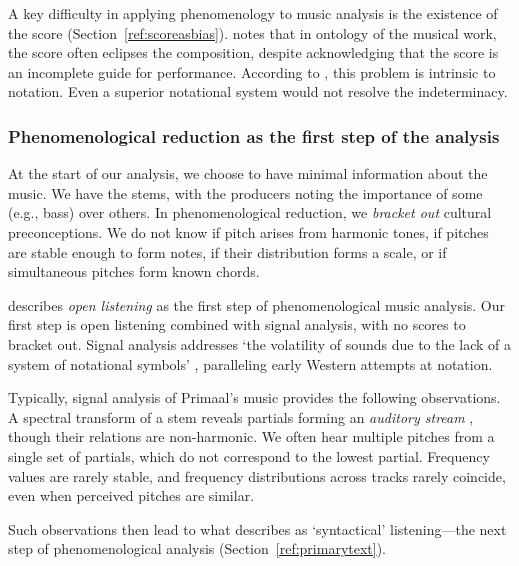 \documentclass{article}
\begin{document}

A key difficulty in applying phenomenology to music analysis is the existence of the score (Section~\ref{ref:scoreasbias}). \citet{benson2011phenomenology} notes that in  ontology of the musical work, the score often eclipses the composition, despite acknowledging that the score is an incomplete guide for performance. According to \citeauthor{benson2011phenomenology}, this problem is intrinsic to notation. Even a superior notational system would not resolve the indeterminacy.


\subsubsection{Phenomenological reduction as the first step of the analysis}\label{ref:reduction}



At the start of our analysis, we choose to have minimal information about the music. We have the stems, with the producers noting the importance of some (e.g., bass) over others. In phenomenological reduction, we \emph{bracket out} cultural preconceptions. We do not know if pitch arises from harmonic tones, if pitches are stable enough to form notes, if their distribution forms a scale, or if simultaneous pitches form known chords.%

\citet[p.~359]{ferrara1984phenomenology} describes \textit{open listening} as the first step of phenomenological music analysis. Our first step is open listening combined with signal analysis, with no scores to bracket out. Signal analysis addresses `the volatility of sounds due to the lack of a system of notational symbols' \citep[p.~103]{aluas1996quatour}, paralleling early Western attempts at notation.

Typically, signal analysis of Primaal's music provides the following observations. A spectral transform of a stem reveals partials forming an {\em auditory stream\/} \citep{bregman1994auditory}, though their relations are non-harmonic. We often hear multiple pitches from a single set of partials, which do not correspond to the lowest partial. Frequency values are rarely stable, and frequency distributions across tracks rarely coincide, even when perceived pitches are similar.

Such observations then lead to what \citet[p.~359]{ferrara1984phenomenology} describes as `syntactical' listening---the next step of phenomenological analysis (Section~\ref{ref:primarytext}).
\end{document}
